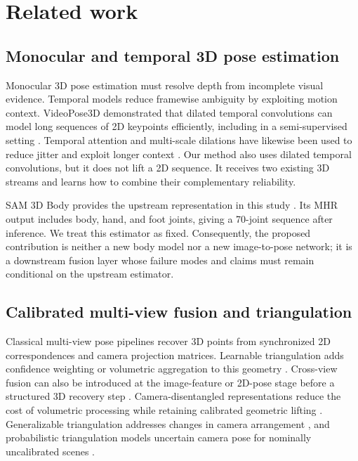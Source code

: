 \section{Related work}
\label{sec:related}

\subsection{Monocular and temporal 3D pose estimation}

Monocular 3D pose estimation must resolve depth from incomplete visual
evidence. Temporal models reduce framewise ambiguity by exploiting motion
context. VideoPose3D demonstrated that dilated temporal convolutions can model
long sequences of 2D keypoints efficiently, including in a semi-supervised
setting \citep{Pavllo2019VideoPose3D}. Temporal attention and multi-scale
dilations have likewise been used to reduce jitter and exploit longer context
\citep{Liu2020TemporalAttention}. Our method also uses dilated temporal
convolutions, but it does not lift a 2D sequence. It receives two existing 3D
streams and learns how to combine their complementary reliability.

SAM 3D Body provides the upstream representation in this study
\citep{Yang2026SAM3DBody}. Its MHR output includes body, hand, and foot joints,
giving a 70-joint sequence after inference. We treat this estimator as fixed.
Consequently, the proposed contribution is neither a new body model nor a new
image-to-pose network; it is a downstream fusion layer whose failure modes and
claims must remain conditional on the upstream estimator.

\subsection{Calibrated multi-view fusion and triangulation}

Classical multi-view pose pipelines recover 3D points from synchronized 2D
correspondences and camera projection matrices. Learnable triangulation adds
confidence weighting or volumetric aggregation to this geometry
\citep{Iskakov2019Learnable}. Cross-view fusion can also be introduced at the
image-feature or 2D-pose stage before a structured 3D recovery step
\citep{Qiu2019CrossView}. Camera-disentangled representations reduce the cost of
volumetric processing while retaining calibrated geometric lifting
\citep{Remelli2020Lightweight}. Generalizable triangulation addresses changes in
camera arrangement \citep{Bartol2022Generalizable}, and probabilistic
triangulation models uncertain camera pose for nominally uncalibrated scenes
\citep{Jiang2023Probabilistic}.

